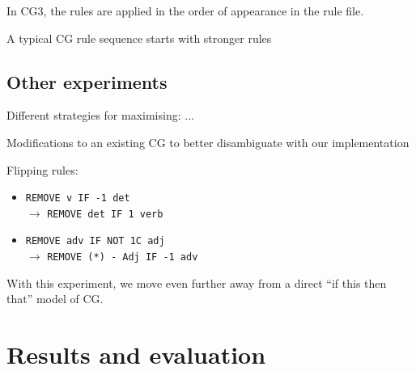 \documentclass[11pt]{article}
\begin{document}
In CG3, the rules are applied in the order of appearance in the rule file.

A typical CG rule sequence starts with stronger rules  

\subsection{Other experiments}

Different strategies for maximising: ...

Modifications to an existing CG to better disambiguate with our implementation

Flipping rules: 
\begin{itemize}
\item [] \texttt{REMOVE v IF -1 det} \\ $\rightarrow$ \texttt{REMOVE det IF 1 verb}   
\item [] \texttt{REMOVE adv IF NOT 1C adj} \\ $\rightarrow$ \texttt{REMOVE (*) - Adj  IF -1 adv}  \\
\end{itemize}

With this experiment, we move even further away from a direct ``if this then that'' model of CG.

\section{Results and evaluation}







\end{document}
